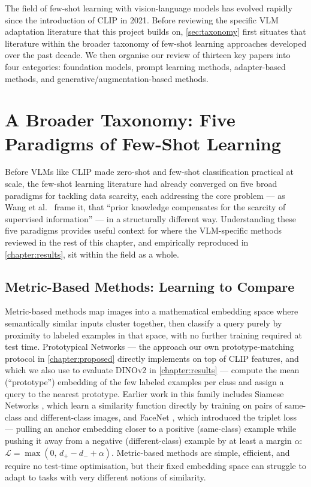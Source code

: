 \documentclass{iutbscthesis}
\begin{document}
The field of few-shot learning with vision-language models has evolved rapidly since the introduction of CLIP in 2021. Before reviewing the specific VLM adaptation literature that this project builds on, \autoref{sec:taxonomy} first situates that literature within the broader taxonomy of few-shot learning approaches developed over the past decade. We then organise our review of thirteen key papers into four categories: foundation models, prompt learning methods, adapter-based methods, and generative/augmentation-based methods.

\section{A Broader Taxonomy: Five Paradigms of Few-Shot Learning} \label{sec:taxonomy}

Before VLMs like CLIP made zero-shot and few-shot classification practical at scale, the few-shot learning literature had already converged on five broad paradigms for tackling data scarcity, each addressing the core problem --- as Wang et al.\ \cite{wang2020fslsurvey} frame it, that ``prior knowledge compensates for the scarcity of supervised information'' --- in a structurally different way. Understanding these five paradigms provides useful context for where the VLM-specific methods reviewed in the rest of this chapter, and empirically reproduced in \autoref{chapter:results}, sit within the field as a whole.

\subsection{Metric-Based Methods: Learning to Compare}
Metric-based methods map images into a mathematical embedding space where semantically similar inputs cluster together, then classify a query purely by proximity to labeled examples in that space, with no further training required at test time. Prototypical Networks \cite{snell2017protonet} --- the approach our own prototype-matching protocol in \autoref{chapter:proposed} directly implements on top of CLIP features, and which we also use to evaluate DINOv2 in \autoref{chapter:results} --- compute the mean (``prototype'') embedding of the few labeled examples per class and assign a query to the nearest prototype. Earlier work in this family includes Siamese Networks \cite{koch2015siamese}, which learn a similarity function directly by training on pairs of same-class and different-class images, and FaceNet \cite{schroff2015facenet}, which introduced the triplet loss --- pulling an anchor embedding closer to a positive (same-class) example while pushing it away from a negative (different-class) example by at least a margin $\alpha$: $\mathcal{L} = \max(0,\, d_{+} - d_{-} + \alpha)$. Metric-based methods are simple, efficient, and require no test-time optimisation, but their fixed embedding space can struggle to adapt to tasks with very different notions of similarity.
\end{document}
